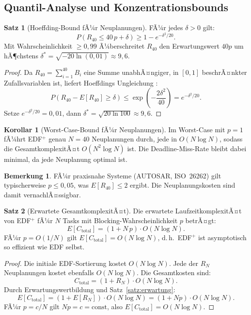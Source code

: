 ﻿\documentclass[a4paper,12pt]{article}
\theoremstyle{definition}
\newtheorem{satz}{Satz}
\newtheorem{bemerkung}{Bemerkung}
\newtheorem{korollar}{Korollar}
\begin{document}
	\subsection{Quantil-Analyse und Konzentrationsbounds}
	
	\begin{satz}[Hoeffding-Bound fÃ¼r Neuplanungen]
		\label{satz:hoeffding}
		FÃ¼r jedes $\delta > 0$ gilt:
		\[
		P\!\left(R_{40} \le 40\,p + \delta\right) \ge 1 - e^{-\delta^2/20}.
		\]
		Mit Wahrscheinlichkeit $\ge 0{,}99$ Ã¼berschreitet $R_{40}$ den Erwartungswert
		$40p$ um hÃ¶chstens $\delta^* = \sqrt{-20\ln(0{,}01)} \approx 9{,}6$.
	\end{satz}
	
	\begin{proof}
		Da $R_{40} = \sum_{i=1}^{40} B_i$ eine Summe unabhÃ¤ngiger, in $[0,1]$
		beschrÃ¤nkter Zufallsvariablen ist, liefert Hoeffdings Ungleichung \cite{Hoeffding1963}:
		\[
		P(R_{40} - E[R_{40}] \ge \delta) \le \exp\!\!\left(-\frac{2\delta^2}{40}\right) = e^{-\delta^2/20}.
		\]
		Setze $e^{-\delta^2/20} = 0{,}01$, dann $\delta^* = \sqrt{20 \ln 100} \approx 9{,}6$.
	\end{proof}
	
	\begin{korollar}[Worst-Case-Bound fÃ¼r Neuplanungen]
		Im Worst-Case mit $p=1$ fÃ¼hrt EDF$^+$ genau $N=40$ Neuplanungen durch,
		jede in $O(N\log N)$, sodass die GesamtkomplexitÃ¤t $O(N^2 \log N)$ ist.
		Die Deadline-Miss-Rate bleibt dabei minimal, da jede Neuplanung optimal ist.
	\end{korollar}
	
	\begin{bemerkung}
		FÃ¼r praxisnahe Systeme (AUTOSAR, ISO~26262) gilt typischerweise $p \le 0{,}05$,
		was $E[R_{40}] \le 2$ ergibt. Die Neuplanungskosten sind damit vernachlÃ¤ssigbar.
	\end{bemerkung}
	
	\begin{satz}[Erwartete GesamtkomplexitÃ¤t]
		\label{satz:komplex}
		Die erwartete LaufzeitkomplexitÃ¤t von EDF$^+$ fÃ¼r $N$ Tasks mit
		Blocking-Wahrscheinlichkeit $p$ betrÃ¤gt:
		\[
		E[C_{\text{total}}] = (1 + N\,p) \cdot O(N\log N).
		\]
		FÃ¼r $p = O(1/N)$ gilt $E[C_{\text{total}}] = O(N \log N)$, d.\,h.\
		EDF$^+$ ist asymptotisch so effizient wie EDF selbst.
	\end{satz}
	
	\begin{proof}
		Die initiale EDF-Sortierung kostet $O(N\log N)$. Jede der $R_N$ Neuplanungen
		kostet ebenfalls $O(N\log N)$. Die Gesamtkosten sind:
		\[
		C_{\text{total}} = (1 + R_N) \cdot O(N\log N).
		\]
		Durch Erwartungswertbildung und Satz~\ref{satz:erwartung}:
		\[
		E[C_{\text{total}}] = (1 + E[R_N]) \cdot O(N\log N) = (1 + Np) \cdot O(N\log N).
		\]
		FÃ¼r $p = c/N$ gilt $Np = c = \mathrm{const}$, also $E[C_{\text{total}}] = O(N\log N)$.
	\end{proof}
	
\end{document}
